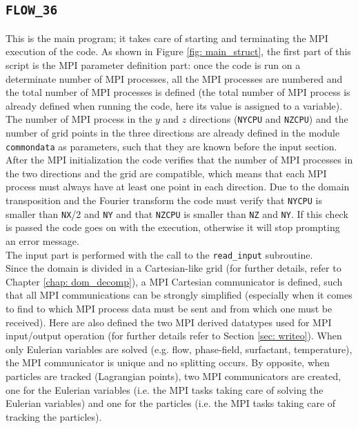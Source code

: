 \subsection{\texttt{FLOW\_36}}
This is the main program; it takes care of starting and terminating the MPI execution of the code. As shown in Figure \ref{fig: main_struct}, the first part of this script is the MPI parameter definition part: once the code is run on a determinate number of MPI processes, all the MPI processes are numbered and the total number of MPI processes is defined (the total number of MPI process is already defined when running the code, here its value is assigned to a variable). The number of MPI process in the $y$ and $z$ directions (\texttt{NYCPU} and \texttt{NZCPU}) and the number of grid points in the three directions are already defined in the module \texttt{commondata} as parameters, such that they are known before the input section. After the MPI initialization the code verifies that the number of MPI processes in the two directions and the grid are compatible, which means that each MPI process must always have at least one point in each direction. Due to the domain transposition and the Fourier transform the code must verify that \texttt{NYCPU} is smaller than \texttt{NX}/2 and \texttt{NY} and that \texttt{NZCPU} is smaller than \texttt{NZ} and \texttt{NY}. If this check is passed the code goes on with the execution, otherwise it will stop prompting an error message.\\
The input part is performed with the call to the \texttt{read\_input} subroutine.\\
Since the domain is divided in a Cartesian-like grid (for further details, refer to Chapter \ref{chap: dom_decomp}), a MPI Cartesian communicator is defined, such that all MPI communications can be strongly simplified (especially when it comes to find to which MPI process data must be sent and from which one must be received). Here are also defined the two MPI derived datatypes used for MPI input/output operation (for further details refer to Section \ref{sec: writeo}).
When only Eulerian variables are solved (e.g. flow, phase-field, surfactant, temperature), the MPI communicator is unique and no splitting occurs. 
By opposite, when particles are tracked (Lagrangian points), two MPI communicators are created, one for the Eulerian variables (i.e. the MPI tasks taking care of solving the Eulerian variables) and one for the particles (i.e. the MPI tasks taking care of tracking the particles).
\\
\def\arraystretch{0.4}
